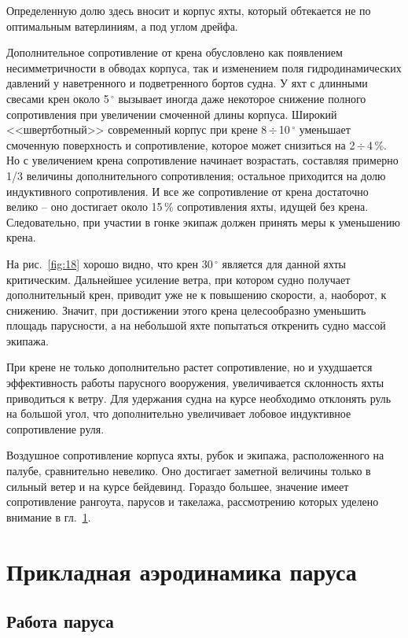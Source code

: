 \documentclass[a4paper, 12pt, twoside, final, book, russian, fittopage, cyremdash]{ncc}
\newcommand{\gr}{\ensuremath{\,^\circ}\xspace}
\newcommand{\otdo}{\,\ensuremath{\div}\,}
\newcommand{\ris}[1]{\ref{fig:#1}}
\begin{document}
Определенную долю здесь вносит и корпус яхты, который обтекается не по оптимальным ватерлиниям, а под углом дрейфа. 

Дополнительное сопротивление от крена обусловлено как появлением несимметричности в обводах корпуса, так и изменением поля гидродинамических давлений у наветренного и подветренного бортов судна. У яхт с длинными свесами крен около 5\gr вызывает иногда даже некоторое снижение полного сопротивления при увеличении смоченной длины корпуса. Широкий <<швертботный>> современный корпус при крене 8\otdo 10\gr уменьшает смоченную поверхность и сопротивление, которое может снизиться на 2\otdo 4\,\%. Но с увеличением крена сопротивление начинает возрастать, составляя примерно 1/3 величины дополнительного сопротивления; остальное приходится на долю индуктивного сопротивления. И все же сопротивление от крена достаточно велико \--- оно достигает около 15\,\% сопротивления яхты, идущей без крена. Следовательно, при участии в гонке экипаж должен принять меры к уменьшению крена.

На рис.~\ris{18} хорошо видно, что крен 30\gr является для данной яхты критическим. Дальнейшее усиление ветра, при котором судно получает дополнительный крен, приводит уже не к повышению скорости, а, наоборот, к снижению. Значит, при достижении этого крена целесообразно уменьшить площадь парусности, а на небольшой яхте попытаться откренить судно массой экипажа.

При крене не только дополнительно растет сопротивление, но и ухудшается эффективность работы парусного вооружения, увеличивается склонность яхты приводиться к ветру. Для удержания судна на курсе необходимо отклонять руль на большой угол, что дополнительно увеличивает лобовое индуктивное сопротивление руля. 

Воздушное сопротивление корпуса яхты, рубок и экипажа, расположенного на палубе, сравнительно невелико. Оно достигает заметной величины только в сильный ветер и на курсе бейдевинд. Гораздо большее, значение имеет сопротивление рангоута, парусов и такелажа, рассмотрению которых уделено внимание в гл.~\ref{chap:2}.

\chapter{Прикладная аэродинамика паруса}\label{chap:2}

\section{Работа паруса}
\end{document}
